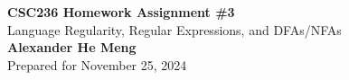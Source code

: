 \begin{titlepage}
    \null %
    \vfill
    \begin{center}
        {\fontsize{40}{48}\selectfont \bfseries CSC236 Homework Assignment \#3}
        \vspace{20pt} \\
        {\LARGE Language Regularity, Regular Expressions, and DFAs/NFAs} \\
        \vspace{20pt}
        \textbf{Alexander He Meng}
        \vspace{8pt}
        \\ Prepared for November 25, 2024
    \end{center}
    \vfill
\end{titlepage}
